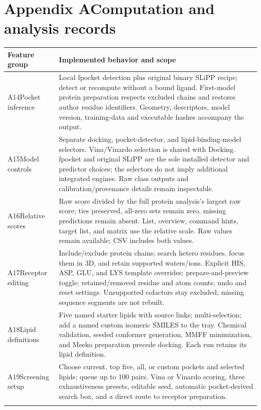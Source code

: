 \section*{Appendix A\quad Computation and analysis records}
\begingroup
\small
\setlength{\tabcolsep}{7pt}
\renewcommand{\arraystretch}{1.18}
\begin{tabularx}{\textwidth}{@{}>{\raggedright\arraybackslash}p{1.23in}>{\raggedright\arraybackslash}X@{}}
\toprule
\textbf{Feature group} & \textbf{Implemented behavior and scope}\\\midrule
A14\quad Pocket inference & Local fpocket detection plus original binary SLiPP recipe; detect or recompute without a bound ligand. First-model protein preparation respects excluded chains and restores author residue identifiers. Geometry, descriptors, model version, training-data and executable hashes accompany the output.\\\addlinespace
A15\quad Model controls & Separate docking, pocket-detector, and lipid-binding-model selectors. Vina/Vinardo selection is shared with Docking. fpocket and original SLiPP are the sole installed detector and predictor choices; the selectors do not imply additional integrated engines. Raw class outputs and calibration/provenance details remain inspectable.\\\addlinespace
A16\quad Relative scores & Raw score divided by the full protein analysis's largest raw score; ties preserved, all-zero sets remain zero, missing predictions remain absent. List, overview, command hints, target list, and matrix use the relative scale. Raw values remain available; CSV includes both values.\\\addlinespace
A17\quad Receptor editing & Include/exclude protein chains; search hetero residues, focus them in 3D, and retain supported waters/ions. Explicit HIS, ASP, GLU, and LYS template overrides; prepare-and-preview toggle; retained/removed residue and atom counts; undo and reset settings. Unsupported cofactors stay excluded; missing sequence segments are not rebuilt.\\\addlinespace
A18\quad Lipid definitions & Five named starter lipids with source links; multi-selection; add a named custom isomeric SMILES to the tray. Chemical validation, seeded conformer generation, MMFF minimization, and Meeko preparation precede docking. Each run retains its lipid definition.\\\addlinespace
A19\quad Screening setup & Choose current, top five, all, or custom pockets and selected lipids; queue up to 100 pairs. Vina or Vinardo scoring, three exhaustiveness presets, editable seed, automatic pocket-derived search box, and a direct route to receptor preparation.\\\addlinespace

\end{tabularx}
